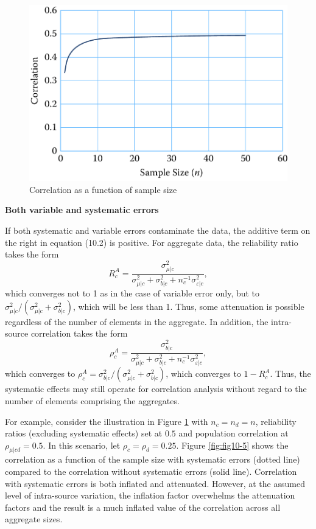 \documentclass[]{krantz}
\begin{document}
\begin{figure}

{\centering \includegraphics[width=0.7\linewidth]{ChapterError/figures/fig10-4} 

}

\caption{Correlation as a function of sample size}\label{fig:fig10-4}
\end{figure}

\textbf{Both variable and systematic errors}

If both systematic and variable errors contaminate the data, the
additive term on the right in equation (10.2) is positive. For aggregate
data, the reliability ratio takes the form \[\label{eq:10-1.8}
R_c^A = \frac{{\sigma_{\mu |c}^2}}{{\sigma_{\mu |c}^2 + \sigma
_{b|c}^2 + n_c^{ - 1}\sigma_{\varepsilon |c}^2}},\] which converges not
to 1 as in the case of variable error only, but to
\(\sigma_{\mu \vert c}^2 / (\sigma_{\mu \vert c}^2 + \sigma_{b\vert c}^2)\),
which will be less than 1. Thus, some attenuation is possible regardless
of the number of elements in the aggregate. In addition, the
intra-source correlation takes the form \[\label{eq:10-1.9}
\rho_c^A = \frac{{\sigma_{b|c}^2}}{{\sigma_{\mu |c}^2 +
\sigma_{b|c}^2 + n_c^{ - 1}\sigma_{\varepsilon |c}^2}},\] which
converges to
\(\rho_c^A = \sigma_{b|c}^2/(\sigma_{\mu |c}^2 + \sigma _{b|c}^2)\),
which converges to \(1 - R_c^A\). Thus, the systematic effects may still
operate for correlation analysis without regard to the number of
elements comprising the aggregates.

For example, consider the illustration in Figure \ref{fig:fig10-4} with
\(n_c = n_d = n\), reliability ratios (excluding systematic effects) set
at \(0.5\) and population correlation at \(\rho_{\mu \vert cd} = 0.5\).
In this scenario, let \(\rho_c = \rho_d = 0.25\). Figure
\ref{fig:fig10-5} shows the correlation as a function of the sample size
with systematic errors (dotted line) compared to the correlation without
systematic errors (solid line). Correlation with systematic errors is
both inflated and attenuated. However, at the assumed level of
intra-source variation, the inflation factor overwhelms the attenuation
factors and the result is a much inflated value of the correlation
across all aggregate sizes.
\end{document}
